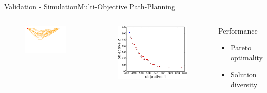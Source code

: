 \begin{frame}{Validation - Simulation}{Multi-Objective Path-Planning}
\begin{columns}
	\begin{figure}
		\centering
		\includegraphics[width=\linewidth]{figure/sim2-2obj/MORRTstar00-ALL}
	\end{figure}
	\begin{figure}
		\centering
		\includegraphics[width=\linewidth]{figure/sim2-2obj/PF02-MORRT2}
	\end{figure}
\begin{block}{Performance}
\begin{itemize}
\item Pareto optimality
\item Solution diversity
\end{itemize}
\end{block}	
\end{columns}
	
\end{frame}


